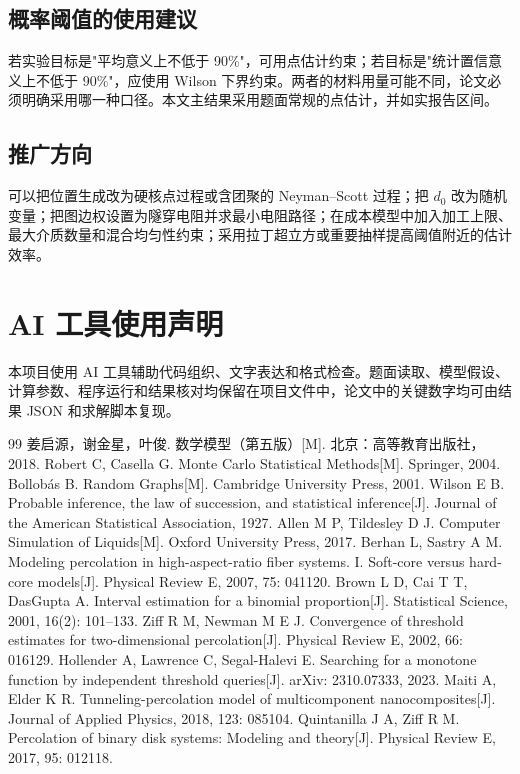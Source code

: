 \documentclass[12pt,a4paper,fontset=windows]{ctexart}
\begin{document}
\subsection{概率阈值的使用建议}
若实验目标是"平均意义上不低于 90\%"，可用点估计约束；若目标是"统计置信意义上不低于 90\%"，应使用 Wilson 下界约束。两者的材料用量可能不同，论文必须明确采用哪一种口径。本文主结果采用题面常规的点估计，并如实报告区间。

\subsection{推广方向}
可以把位置生成改为硬核点过程或含团聚的 Neyman--Scott 过程；把 $d_0$ 改为随机变量；把图边权设置为隧穿电阻并求最小电阻路径；在成本模型中加入加工上限、最大介质数量和混合均匀性约束；采用拉丁超立方或重要抽样提高阈值附近的估计效率。

\section*{AI 工具使用声明}
本项目使用 AI 工具辅助代码组织、文字表达和格式检查。题面读取、模型假设、计算参数、程序运行和结果核对均保留在项目文件中，论文中的关键数字均可由结果 JSON 和求解脚本复现。

\begin{thebibliography}{99}
 姜启源，谢金星，叶俊. 数学模型（第五版）[M]. 北京：高等教育出版社，2018.
 Robert C, Casella G. Monte Carlo Statistical Methods[M]. Springer, 2004.
 Bollobás B. Random Graphs[M]. Cambridge University Press, 2001.
 Wilson E B. Probable inference, the law of succession, and statistical inference[J]. Journal of the American Statistical Association, 1927.
 Allen M P, Tildesley D J. Computer Simulation of Liquids[M]. Oxford University Press, 2017.
 Berhan L, Sastry A M. Modeling percolation in high-aspect-ratio fiber systems. I. Soft-core versus hard-core models[J]. Physical Review E, 2007, 75: 041120.
 Brown L D, Cai T T, DasGupta A. Interval estimation for a binomial proportion[J]. Statistical Science, 2001, 16(2): 101--133.
 Ziff R M, Newman M E J. Convergence of threshold estimates for two-dimensional percolation[J]. Physical Review E, 2002, 66: 016129.
 Hollender A, Lawrence C, Segal-Halevi E. Searching for a monotone function by independent threshold queries[J]. arXiv: 2310.07333, 2023.
 Maiti A, Elder K R. Tunneling-percolation model of multicomponent nanocomposites[J]. Journal of Applied Physics, 2018, 123: 085104.
 Quintanilla J A, Ziff R M. Percolation of binary disk systems: Modeling and theory[J]. Physical Review E, 2017, 95: 012118.
\end{thebibliography}
\end{document}
